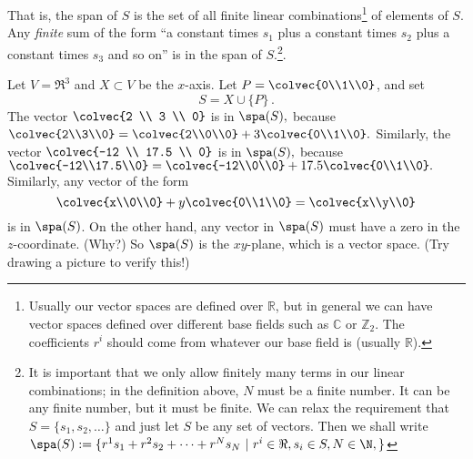 That is, the span of \(S\) is the set of all finite linear combinations\footnote{Usually our vector spaces are defined over \(\mathbb{R}\), but in general we can have vector spaces defined over different base fields such as \(\mathbb{C}\) or \(\mathbb{Z}_2\). The coefficients \(r^i\) should come from whatever our base field is (usually \(\mathbb{R}\)).} of elements of \(S\). Any {\itshape finite} sum of the form ``a constant times \(s_1\) plus a constant times \(s_2\) plus a constant times \(s_3\) and so on'' is in the span of \(S\).\footnote{It is important that we only allow finitely many terms in our linear combinations; in the definition above, \(N\) must be a finite number. It can be any finite number, but it must be finite. We can relax the requirement that $S=\{s_1,s_2,\ldots\}$ and just let $S$ be any set of vectors. Then we shall write $\spa(S):=\{ r^1s_1+r^2s_2+\cdots + r^Ns_N ~|~ r^i\in \Re, s_i\in S, N\in \N, \}$
 }.

\begin{example}
Let $V=\Re^3$ and $X\subset V$ be the $x$-axis.  Let $P=\colvec{0\\1\\0}$, and set \[S=X \cup \{P\}\, .\]
The vector \(\colvec{2 \\ 3 \\ 0}\) is in \(\spa(S),\) because \(\colvec{2\\3\\0}=\colvec{2\\0\\0}+3\colvec{0\\1\\0}.\) Similarly, the vector \(\colvec{-12 \\ 17.5 \\ 0}\) is in \(\spa(S),\) because \(\colvec{-12\\17.5\\0}=\colvec{-12\\0\\0}+17.5\colvec{0\\1\\0}.\)
Similarly, any vector of the form
\[
\colvec{x\\0\\0}+y \colvec{0\\1\\0} = \colvec{x\\y\\0}
\]
is in \(\spa(S)\). On the other hand, any vector in \(\spa(S)\) must have a zero in the \(z\)-coordinate. (Why?) 
So $\spa(S)$ is the $xy$-plane, which is a vector space.  (Try drawing a picture to verify this!)
\end{example}

